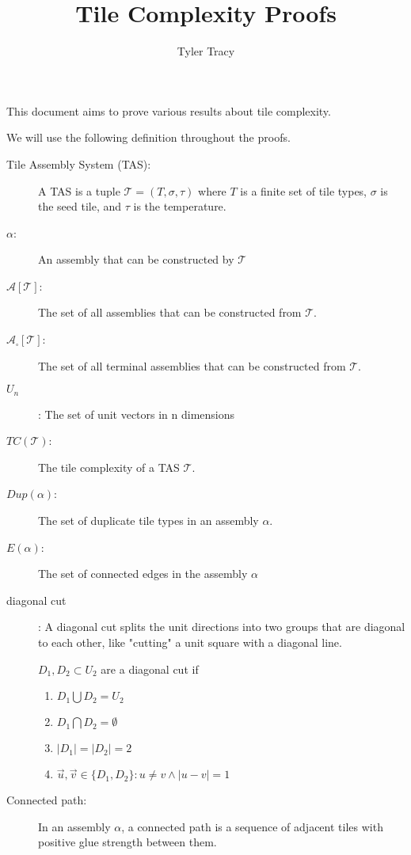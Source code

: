 \documentclass[12pt]{article}
\title{Tile Complexity Proofs}
\author{Tyler Tracy}
\begin{document}
\maketitle

This document aims to prove various results about tile complexity.

We will use the following definition throughout the proofs.

\begin{description}
    \item[Tile Assembly System (TAS):] A TAS is a tuple $\mathcal{T} = (T, \sigma, \tau)$ where $T$ is a finite set of tile types, $\sigma$ is the seed tile, and $\tau$ is the temperature.
    \item[$\alpha$:] An assembly that can be constructed by $\mathcal{T}$
    \item[{$\mathcal{A}[\mathcal{T}]$}:] The set of all assemblies that can be constructed from $\mathcal{T}$.
    \item[{$\mathcal{A}_{\square}[\mathcal{T}]$}:] The set of all terminal assemblies that can be constructed from $\mathcal{T}$.
    \item[$U_n$]: The set of unit vectors in n dimensions
    \item[{$TC(\mathcal{T})$}:] The tile complexity of a TAS $\mathcal{T}$.
    \item[$Dup(\alpha)$:] The set of duplicate tile types in an assembly $\alpha$.
    \item[$E(\alpha)$:] The set of connected edges in the assembly $\alpha$ 

    \item[diagonal cut]: A diagonal cut splits the unit directions into two groups that are diagonal to each other, like "cutting" a unit square with a diagonal line. 

        $D_1, D_2 \subset U_2$ are a diagonal cut if 

        \begin{enumerate}
            \item $D_1 \bigcup D_2 = U_2$
            \item $D_1 \bigcap D_2 = \emptyset$
            \item $|D_1| = |D_2| = 2$
            \item $ \vec{u}, \vec{v} \in \{D_1, D_2 \} : u \ne v \land |u - v| = 1$
        \end{enumerate}

    \item[Connected path:] In an assembly $\alpha$, a connected path is a sequence of adjacent tiles with positive glue strength between them.


\end{description}
\end{document}
